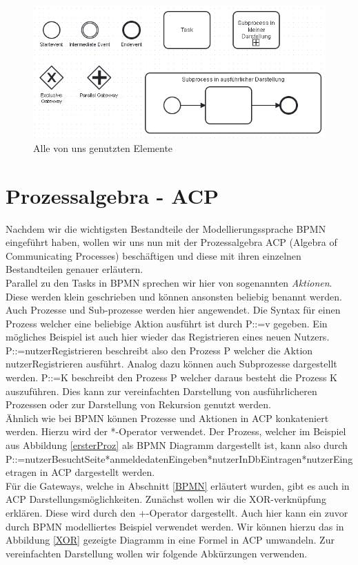 \begin{figure}
\centering
\includegraphics[scale=0.5]{Figures/Alleblocke}
\decoRule
\caption[Alle Elemente]{Alle von uns genutzten Elemente}
\label{alleElem}
\end{figure}
\section {Prozessalgebra - ACP}\label {Prozessalgebra - ACP}
Nachdem wir die wichtigsten Bestandteile der Modellierungssprache BPMN eingeführt haben, wollen wir uns nun mit der Prozessalgebra ACP (Algebra of Communicating Processes) beschäftigen und diese mit ihren einzelnen Bestandteilen genauer erläutern.\\
Parallel zu den Tasks in BPMN sprechen wir hier von sogenannten \textit{Aktionen}. Diese werden klein geschrieben und können ansonsten beliebig benannt werden. Auch Prozesse und Sub-prozesse werden hier angewendet. Die Syntax für einen Prozess welcher eine beliebige Aktion ausführt ist durch P::=v gegeben. Ein mögliches Beispiel ist auch hier wieder das Registrieren eines neuen Nutzers. P::=nutzerRegistrieren beschreibt also den Prozess P welcher die Aktion nutzerRegistrieren ausführt. Analog dazu können auch Subprozesse dargestellt werden. P::=K beschreibt den Prozess P welcher daraus besteht die Prozess K auszuführen. Dies kann zur vereinfachten Darstellung von ausführlicheren Prozessen oder zur Darstellung von Rekursion genutzt werden.\\
Ähnlich wie bei BPMN können Prozesse und Aktionen in ACP konkateniert werden. Hierzu wird der *-Operator verwendet. Der Prozess, welcher im Beispiel aus Abbildung \ref{ersterProz} als BPMN Diagramm dargestellt ist, kann also durch P::=nutzerBesuchtSeite*anmeldedatenEingeben*nutzerInDbEintragen*nutzerEingetragen in ACP dargestellt werden.\\
Für die Gateways, welche in Abschnitt \ref{BPMN} erläutert wurden, gibt es auch in ACP Darstellungsmöglichkeiten. Zunächst wollen wir die XOR-verknüpfung erklären. Diese wird durch den +-Operator dargestellt. Auch hier kann ein zuvor durch BPMN modelliertes Beispiel verwendet werden. Wir können hierzu das in Abbildung \ref{XOR} gezeigte Diagramm in eine Formel in ACP umwandeln. Zur vereinfachten Darstellung wollen wir folgende Abkürzungen verwenden.\\
